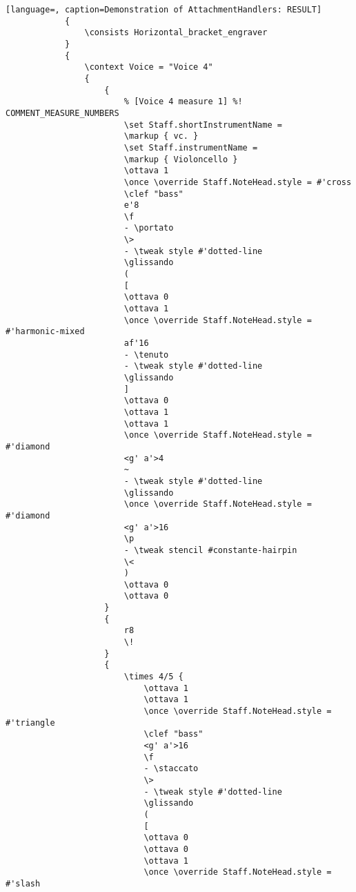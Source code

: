 \begin{lstlisting}[language=, caption=Demonstration of AttachmentHandlers: RESULT]
            {
                \consists Horizontal_bracket_engraver
            }
            {
                \context Voice = "Voice 4"
                {
                    {
                        % [Voice 4 measure 1] %! COMMENT_MEASURE_NUMBERS
                        \set Staff.shortInstrumentName =
                        \markup { vc. }
                        \set Staff.instrumentName =
                        \markup { Violoncello }
                        \ottava 1
                        \once \override Staff.NoteHead.style = #'cross
                        \clef "bass"
                        e'8
                        \f
                        - \portato
                        \>
                        - \tweak style #'dotted-line
                        \glissando
                        (
                        [
                        \ottava 0
                        \ottava 1
                        \once \override Staff.NoteHead.style = #'harmonic-mixed
                        af'16
                        - \tenuto
                        - \tweak style #'dotted-line
                        \glissando
                        ]
                        \ottava 0
                        \ottava 1
                        \ottava 1
                        \once \override Staff.NoteHead.style = #'diamond
                        <g' a'>4
                        ~
                        - \tweak style #'dotted-line
                        \glissando
                        \once \override Staff.NoteHead.style = #'diamond
                        <g' a'>16
                        \p
                        - \tweak stencil #constante-hairpin
                        \<
                        )
                        \ottava 0
                        \ottava 0
                    }
                    {
                        r8
                        \!
                    }
                    {
                        \times 4/5 {
                            \ottava 1
                            \ottava 1
                            \once \override Staff.NoteHead.style = #'triangle
                            \clef "bass"
                            <g' a'>16
                            \f
                            - \staccato
                            \>
                            - \tweak style #'dotted-line
                            \glissando
                            (
                            [
                            \ottava 0
                            \ottava 0
                            \ottava 1
                            \once \override Staff.NoteHead.style = #'slash

\end{lstlisting}
